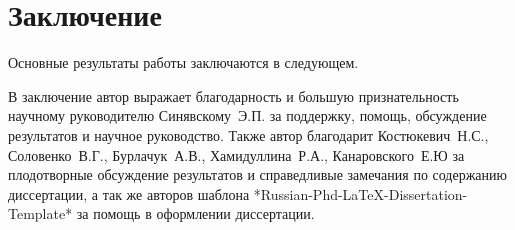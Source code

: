 \chapter*{Заключение}						%


Основные результаты работы заключаются в следующем.


В заключение автор выражает благодарность и большую признательность научному руководителю
Синявскому~Э.П. за поддержку, помощь, обсуждение результатов и научное
руководство. Также автор благодарит Костюкевич~Н.С., Соловенко~В.Г., Бурлачук~А.В., Хамидуллина~Р.А., Канаровского~Е.Ю за плодотворные обсуждение результатов и справедливые замечания по содержанию диссертации, а так же авторов шаблона
*Russian-Phd-LaTeX-Dissertation-Template* за помощь в оформлении
диссертации.
